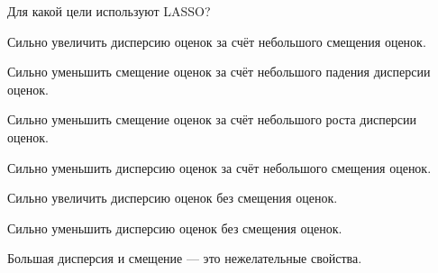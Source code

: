
\begin{question}
Для какой цели используют LASSO?
\begin{answerlist}
  \item Сильно увеличить дисперсию оценок за счёт небольшого смещения оценок.
  \item Сильно уменьшить смещение оценок за счёт небольшого падения дисперсии оценок.
  \item Сильно уменьшить смещение оценок за счёт небольшого роста дисперсии оценок.
  \item Сильно уменьшить дисперсию оценок за счёт небольшого смещения оценок.
  \item Сильно увеличить дисперсию оценок без смещения оценок.
  \item Сильно уменьшить дисперсию оценок без смещения оценок.
\end{answerlist}
\end{question}

\begin{solution}
Большая дисперсия и смещение --- это нежелательные свойства.
\end{solution}

